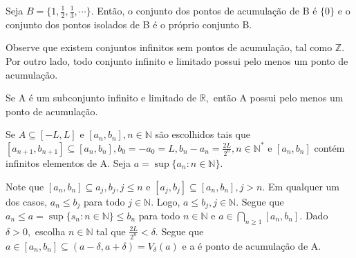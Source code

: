 \documentclass[Analysis/analysis_notes.tex]{subfiles}
\begin{document}
\begin{example}
	Seja $B=\{1, \frac{1}{2}, \frac{1}{3}, \cdots\}$. Ent\~ao, o conjunto dos pontos de acumula\c c\~ao de B \'e $\{0\}$ e o conjunto dos pontos
	isolados de B \'e o pr\'oprio conjunto B.
\end{example}
Observe que existem conjuntos infinitos sem pontos de acumula\c c\~ao, tal como $\mathbb{Z}.$ Por outro lado, todo conjunto infinito e limitado possui
pelo menos um ponto de acumula\c c\~ao.
\begin{theorem*}
	Se A \'e um subconjunto infinito e limitado de $\mathbb{R},$ ent\~ao A possui pelo menos um ponto de acumula\c c\~ao.
\end{theorem*}
\begin{proof*}
	Se $A\subseteq{[-L, L]}$ e $[a_{n}, b_{n}], n\in \mathbb{N}$ s\~ao escolhidos tais que $[a_{n+1}, b_{n+1}]\subseteq{[a_{n}, b_{n}]}, b_{0} = -a_{0} = L,
		b_{n} - a_{n} = \frac{2L}{2^{n}}, n\in \mathbb{N}^*$ e $[a_{n}, b_{n}]$ cont\'em infinitos elementos de A. Seja $a = \sup{\{a_{n}: n\in \mathbb{N}\}}$.

	Note que $[a_{n}, b_{n}]\subseteq{a_{j}, b_{j}}, j\leq{n}$ e $[a_{j}, b_{j}]\subseteq{[a_{n}, b_{n}]}, j>n.$ Em qualquer um dos casos, $a_{n}\leq{b_{j}}$
	para todo $j\in \mathbb{N}$. Logo, $a \leq{b_{j}}, j\in \mathbb{N}.$ Segue que $a_{n}\leq{a=\sup \{s_{n}: n\in \mathbb{N}\}}\leq{b_{n}}$ para todo
	$n\in \mathbb{N}$ e $a\in\displaystyle\bigcap_{n\geq{1}}[a_{n}, b_{n}]$. Dado $\delta > 0,$ escolha $n\in \mathbb{N}$ tal que $\frac{2L}{2^{n}}<\delta.$ Segue
	que $a\in[a_{n}, b_{n}]\subseteq{(a-\delta, a+\delta) = V_{\delta}(a)}$ e a \'e ponto de acumula\c c\~ao de A. \qedsymbol
\end{proof*}
\newpage
\end{document}
